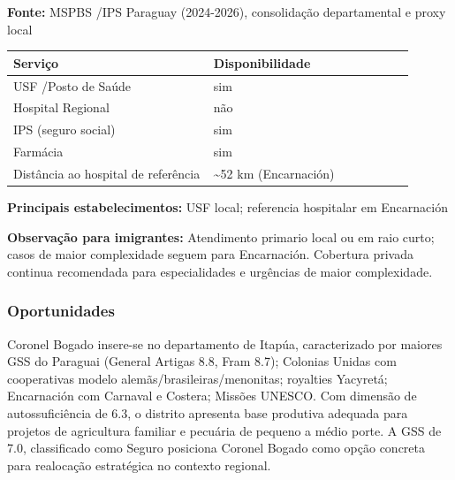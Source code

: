 \textbf{Fonte:} MSPBS /\allowbreak  IPS Paraguay (2024-2026), consolidação
departamental e proxy local

{\def\LTcaptype{none} %
\begin{longtable}{@{}>{\raggedright\arraybackslash}p{0.45\linewidth} >{\raggedright\arraybackslash}p{0.45\linewidth}@{}}
\toprule\noalign{}
Serviço & Disponibilidade \\
\midrule\noalign{}
\endhead
\bottomrule\noalign{}
\endlastfoot
USF /\allowbreak  Posto de Saúde & sim \\
Hospital Regional & não \\
IPS (seguro social) & sim \\
Farmácia & sim \\
Distância ao hospital de referência & \textasciitilde52 km
(Encarnación) \\
\end{longtable}
}

\textbf{Principais estabelecimentos:} USF local; referencia hospitalar
em Encarnación

\textbf{Observação para imigrantes:} Atendimento primario local ou em
raio curto; casos de maior complexidade seguem para Encarnación.
Cobertura privada continua recomendada para especialidades e urgências
de maior complexidade.
\newpage

\subsubsection*{Oportunidades}\label{oport-coronel-bogado-0708}
Coronel Bogado insere-se no departamento de Itapúa, caracterizado por maiores GSS do Paraguai (General Artigas 8.8, Fram 8.7); Colonias Unidas com cooperativas modelo alemãs/brasileiras/menonitas; royalties Yacyretá; Encarnación com Carnaval e Costera; Missões UNESCO. Com dimensão de autossuficiência de 6.3, o distrito apresenta base produtiva adequada para projetos de agricultura familiar e pecuária de pequeno a médio porte. A GSS de 7.0, classificado como Seguro posiciona Coronel Bogado como opção concreta para realocação estratégica no contexto regional.

